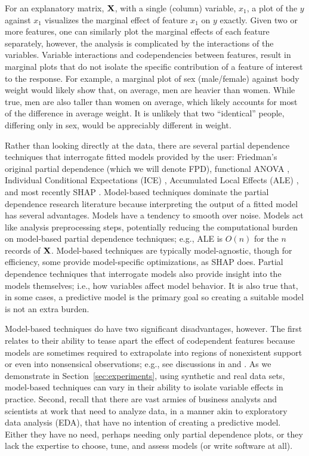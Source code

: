 \documentclass[smallextended]{svjour3}       %
\newcommand{\secref}[1]{Section~\ref{#1}}
\begin{document}
For an explanatory matrix, $\bf X$, with a single (column) variable, $x_1$, a plot of the $y$ against $x_1$ visualizes the marginal effect of feature $x_1$ on $y$ exactly. Given two or more features, one can similarly plot the marginal effects of each feature separately, however, the analysis is complicated by the interactions of the variables.   Variable interactions and codependencies between features, result in marginal plots that do not isolate the specific contribution of a feature of interest to the response. For example, a marginal plot of sex (male/female) against body weight would likely show that, on average, men are heavier than women. While true, men are also taller than women on average, which likely accounts for most of the difference in average weight. It is unlikely that two ``identical'' people, differing only in sex, would be appreciably different in weight.  

Rather than looking directly at the data, there are several partial dependence techniques that interrogate fitted models provided by the user: Friedman's original partial dependence \citep{PDP} (which we will denote FPD), functional ANOVA \citep{fanova}, Individual Conditional Expectations (ICE) \citep{ICE}, Accumulated Local Effects (ALE) \citep{ALE}, and most recently SHAP \citep{shap}.  Model-based techniques dominate the partial dependence research literature because interpreting the output of a fitted model  has several advantages. Models have a tendency to smooth over noise. Models act like analysis preprocessing steps, potentially reducing the computational burden on model-based partial dependence techniques; e.g., ALE is $O(n)$ for the $n$ records of $\bf X$. Model-based techniques are typically model-agnostic, though for efficiency, some provide model-specific optimizations, as SHAP does. Partial dependence techniques that interrogate models also provide insight into the models themselves; i.e., how variables affect model behavior.  It is also true that, in some cases, a predictive model is the primary goal so creating a suitable model is not an extra burden.

Model-based techniques do have two significant disadvantages, however. 
The first relates to their ability to tease apart the effect of codependent features because models are sometimes required to extrapolate into regions of nonexistent support or even into nonsensical observations; e.g., see discussions in \citet{ALE} and \citet{fanova}.  As we demonstrate in \secref{sec:experiments}, using synthetic and real data sets, model-based techniques can vary in their ability to isolate variable effects in practice.  Second, recall that there are vast armies of business analysts and scientists at work that need to analyze data, in a manner akin to exploratory data analysis (EDA), that have no intention of creating a predictive model.  Either they have no need, perhaps needing only partial dependence plots, or they lack the expertise to choose, tune, and assess models (or write software at all).
\end{document}

